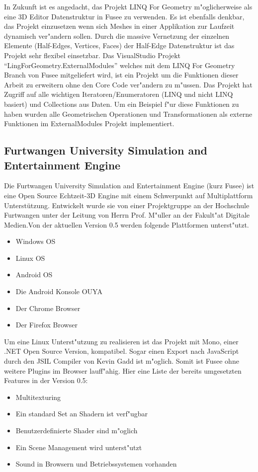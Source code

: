 \documentclass[pagesize, paper=a4, fontsize=12pt,titlepage=true, headings=small, headnosepline, abstractoff, liststotoc, nochapterprefix, plainheadsepline]{scrreprt}
\newcommand{\LFGS}{LINQ For Geometry }
\newcommand{\HES}{Half-Edge Datenstruktur }
\begin{document}
In Zukunft ist es angedacht, das Projekt \LFGS m"oglicherweise als eine 3D Editor Datenstruktur in Fusee zu verwenden. Es ist ebenfalls denkbar, das Projekt einzusetzen wenn sich Meshes in einer Applikation zur Laufzeit dynamisch ver"andern sollen. Durch die massive Vernetzung der einzelnen Elemente (Half-Edges, Vertices, Faces) der \HES ist das Projekt sehr flexibel einsetzbar. Das VisualStudio Projekt "`LingForGeometry.ExternalModules"' welches mit dem \LFGS Branch von Fusee mitgeliefert wird, ist ein Projekt um die Funktionen dieser Arbeit zu erweitern ohne den Core Code ver"andern zu m"ussen. Das Projekt hat Zugriff auf alle wichtigen Iteratoren/Enumeratoren (LINQ und nicht LINQ basiert) und Collections aus Daten. Um ein Beispiel f"ur diese Funktionen zu haben wurden alle Geometrischen Operationen und Transformationen als externe Funktionen im ExternalModules Projekt implementiert.
		\subsection {Furtwangen University Simulation and Entertainment Engine}\label{sec:fusee}
			Die Furtwangen University Simulation and Entertainment Engine (kurz Fusee) ist eine Open Source Echtzeit-3D Engine mit einem Schwerpunkt auf Multiplattform Unterstützung. Entwickelt wurde sie von einer Projektgruppe an der Hochschule Furtwangen unter der Leitung von Herrn Prof. M"uller an der Fakult"at Digitale Medien.Von der aktuellen Version 0.5 werden folgende Plattformen unterst"utzt.
\begin{itemize}
\item Windows OS
\item Linux OS
\item Android OS
\item Die Android Konsole OUYA
\item Der Chrome Browser
\item Der Firefox Browser
\end{itemize}

Um eine Linux Unterst"utzung zu realisieren ist das Projekt mit Mono, einer .NET Open Source Version, kompatibel. Sogar einen Export nach JavaScript durch den JSIL Compiler von Kevin Gadd ist m"oglich. Somit ist Fusee ohne weitere Plugins im Browser lauff"ahig.
\newpage
Hier eine Liste der bereits umgesetzten Features in der Version 0.5:
\begin{itemize}
\item Multitexturing
\item Ein standard Set an Shadern ist verf"ugbar
\item Benutzerdefinierte Shader sind m"oglich
\item Ein Scene Management wird unterst"utzt
\item Sound in Browsern und Betriebssystemen vorhanden
\end{itemize}
\end{document}
